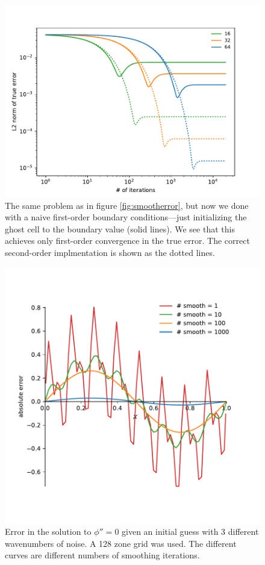 \begin{figure}
\centering
\includegraphics[width=\linewidth]{smooth-badBCs}
\caption[Convergence of smoothing in first-order BCs]{\label{fig:smooth-badbcs} 
  The same problem as in figure \ref{fig:smootherror}, but
  now we done with a naive first-order boundary conditions---just initializing
  the ghost cell to the boundary value (solid lines).  We see that this 
  achieves only first-order convergence in the true error.  The correct
  second-order implmentation is shown as the dotted lines.
  \\ }
\end{figure}


\begin{figure}[t]
\centering
\includegraphics[width=0.8\linewidth]{smooth-multimode}
\caption[Smoothing of different wavenumbers]{\label{fig:mg:smooth}
  Error in the solution to $\phi'' = 0$ given an initial guess with 3
  different wavenumbers of noise.  A 128 zone grid was used.  The
  different curves are different numbers of smoothing
  iterations. \\ }
\end{figure}

